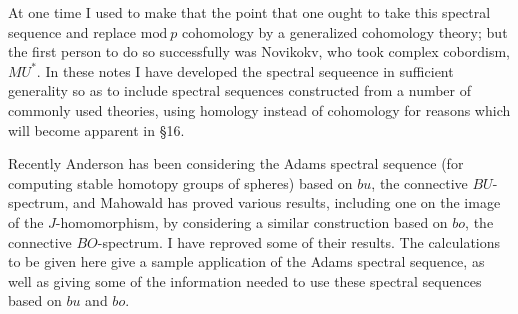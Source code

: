 \documentclass[../main]{subfiles}
\begin{document}
At one time I used to make that the point that one ought to take this spectral sequence and replace $\mathrm{mod}\ p$ cohomology by a generalized cohomology theory; but the first person to do so successfully was Novikokv, who took complex cobordism, $MU^*$. In these notes I have developed the spectral sequeence in sufficient generality so as to include spectral sequences constructed from a number of commonly used theories, using homology instead of cohomology for reasons which will become apparent in \S 16.

Recently Anderson has been considering the Adams spectral sequence (for computing stable homotopy groups of spheres) based on $bu$, the connective $BU$-spectrum, and Mahowald has proved various results, including one on the image of the $J$-homomorphism, by considering a similar construction based on $bo$, the connective $BO$-spectrum. I have reproved some of their results. The calculations to be given here give a sample application of the Adams spectral sequence, as well as giving some of the information needed to use these spectral sequences based on $bu$ and $bo$.
\end{document}
